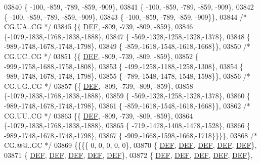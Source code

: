 \begin{DoxyCode}
03840 \{ -100, -859, -789, -859, -909\},
03841 \{ -100, -859, -789, -859, -909\},
03842 \{ -100, -859, -789, -859, -909\},
03843 \{ -100, -859, -789, -859, -909\}\},
03844 \textcolor{comment}{/* CG.UA..CG */}
03845 \{\{  \mbox{\hyperlink{1_88_84__epars_8h_a397419fc12b37ed479c8abb9d444d843}{DEF}}, -809, -739, -809, -859\},
03846 \{-1079,-1838,-1768,-1838,-1888\},
03847 \{ -569,-1328,-1258,-1328,-1378\},
03848 \{ -989,-1748,-1678,-1748,-1798\},
03849 \{ -859,-1618,-1548,-1618,-1668\}\},
03850 \textcolor{comment}{/* CG.UC..CG */}
03851 \{\{  \mbox{\hyperlink{1_88_84__epars_8h_a397419fc12b37ed479c8abb9d444d843}{DEF}}, -809, -739, -809, -859\},
03852 \{ -999,-1758,-1688,-1758,-1808\},
03853 \{ -499,-1258,-1188,-1258,-1308\},
03854 \{ -989,-1748,-1678,-1748,-1798\},
03855 \{ -789,-1548,-1478,-1548,-1598\}\},
03856 \textcolor{comment}{/* CG.UG..CG */}
03857 \{\{  \mbox{\hyperlink{1_88_84__epars_8h_a397419fc12b37ed479c8abb9d444d843}{DEF}}, -809, -739, -809, -859\},
03858 \{-1079,-1838,-1768,-1838,-1888\},
03859 \{ -569,-1328,-1258,-1328,-1378\},
03860 \{ -989,-1748,-1678,-1748,-1798\},
03861 \{ -859,-1618,-1548,-1618,-1668\}\},
03862 \textcolor{comment}{/* CG.UU..CG */}
03863 \{\{  \mbox{\hyperlink{1_88_84__epars_8h_a397419fc12b37ed479c8abb9d444d843}{DEF}}, -809, -739, -809, -859\},
03864 \{-1079,-1838,-1768,-1838,-1888\},
03865 \{ -719,-1478,-1408,-1478,-1528\},
03866 \{ -989,-1748,-1678,-1748,-1798\},
03867 \{ -909,-1668,-1598,-1668,-1718\}\}\}\},
03868 \textcolor{comment}{/* CG.@@..GC */}
03869 \{\{\{\{    0,    0,    0,    0,    0\},
03870 \{  \mbox{\hyperlink{1_88_84__epars_8h_a397419fc12b37ed479c8abb9d444d843}{DEF}},  \mbox{\hyperlink{1_88_84__epars_8h_a397419fc12b37ed479c8abb9d444d843}{DEF}},  \mbox{\hyperlink{1_88_84__epars_8h_a397419fc12b37ed479c8abb9d444d843}{DEF}},  \mbox{\hyperlink{1_88_84__epars_8h_a397419fc12b37ed479c8abb9d444d843}{DEF}},  \mbox{\hyperlink{1_88_84__epars_8h_a397419fc12b37ed479c8abb9d444d843}{DEF}}\},
03871 \{  \mbox{\hyperlink{1_88_84__epars_8h_a397419fc12b37ed479c8abb9d444d843}{DEF}},  \mbox{\hyperlink{1_88_84__epars_8h_a397419fc12b37ed479c8abb9d444d843}{DEF}},  \mbox{\hyperlink{1_88_84__epars_8h_a397419fc12b37ed479c8abb9d444d843}{DEF}},  \mbox{\hyperlink{1_88_84__epars_8h_a397419fc12b37ed479c8abb9d444d843}{DEF}},  \mbox{\hyperlink{1_88_84__epars_8h_a397419fc12b37ed479c8abb9d444d843}{DEF}}\},
03872 \{  \mbox{\hyperlink{1_88_84__epars_8h_a397419fc12b37ed479c8abb9d444d843}{DEF}},  \mbox{\hyperlink{1_88_84__epars_8h_a397419fc12b37ed479c8abb9d444d843}{DEF}},  \mbox{\hyperlink{1_88_84__epars_8h_a397419fc12b37ed479c8abb9d444d843}{DEF}},  \mbox{\hyperlink{1_88_84__epars_8h_a397419fc12b37ed479c8abb9d444d843}{DEF}},  \mbox{\hyperlink{1_88_84__epars_8h_a397419fc12b37ed479c8abb9d444d843}{DEF}}\},

\end{DoxyCode}
